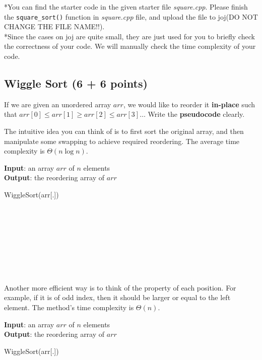 \documentclass[11pt]{exam}
\begin{document}
*You can find the starter code in the given starter file \textit{square.cpp}. Please finish the \lstinline|square_sort()| function in \textit{square.cpp} file, and upload the file to joj(DO NOT CHANGE THE FILE NAME!!). \\
*Since the cases on joj are quite small, they are just used for you to briefly check the correctness of your code. We will manually check the time complexity of your code.


\subsection{Wiggle Sort (6 + 6 points)}
If we are given an unordered array $arr$, we would like to reorder it \textbf{in-place}
such that $arr[0] \leq arr[1] \geq arr[2] \leq arr[3] \dots$ Write the \textbf{pseudocode} clearly.

The intuitive idea you can think of is to first sort the original array, and then
manipulate some swapping to achieve required reordering. The average time complexity
is $\Theta (n \log n)$.

\begin{solution}
    \begin{algorithm}[H]
        \textbf{Input}: an array $arr$ of $n$ elements\\
        \textbf{Output}: the reordering array of $arr$
        \caption{WiggleSort(arr[.])}
        ~\\
        ~\\
        ~\\
        ~\\
        ~\\
        ~\\
        ~\\
    \end{algorithm}
\end{solution}

Another more efficient way is to think of the property of each position. For example, if
it is of odd index, then it should be larger or equal to the left element. The method's time complexity
is $\Theta(n)$.

\begin{solution}
    \begin{algorithm}[H]
        \textbf{Input}: an array $arr$ of $n$ elements\\
        \textbf{Output}: the reordering array of $arr$
        \caption{WiggleSort(arr[.])}
        ~\\
        ~\\
        ~\\
        ~\\
        ~\\
        ~\\
        ~\\
    \end{algorithm}
\end{solution}
\end{document}
